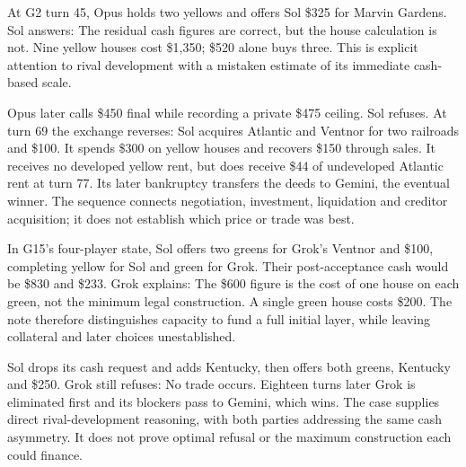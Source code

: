 
At G2 turn 45, Opus holds two yellows and offers Sol \$325 for Marvin Gardens. Sol answers:
The residual cash figures are correct, but the house calculation is not. Nine yellow houses cost \$1,350; \$520 alone buys three. This is explicit attention to rival development with a mistaken estimate of its immediate cash-based scale.

Opus later calls \$450 final while recording a private \$475 ceiling. Sol refuses. At turn 69 the exchange reverses: Sol acquires Atlantic and Ventnor for two railroads and \$100. It spends \$300 on yellow houses and recovers \$150 through sales. It receives no developed yellow rent, but does receive \$44 of undeveloped Atlantic rent at turn 77. Its later bankruptcy transfers the deeds to Gemini, the eventual winner. The sequence connects negotiation, investment, liquidation and creditor acquisition; it does not establish which price or trade was best.


In G15's four-player state, Sol offers two greens for Grok's Ventnor and \$100, completing yellow for Sol and green for Grok. Their post-acceptance cash would be \$830 and \$233. Grok explains:
The \$600 figure is the cost of one house on each green, not the minimum legal construction. A single green house costs \$200. The note therefore distinguishes capacity to fund a full initial layer, while leaving collateral and later choices unestablished.

Sol drops its cash request and adds Kentucky, then offers both greens, Kentucky and \$250. Grok still refuses:
No trade occurs. Eighteen turns later Grok is eliminated first and its blockers pass to Gemini, which wins. The case supplies direct rival-development reasoning, with both parties addressing the same cash asymmetry. It does not prove optimal refusal or the maximum construction each could finance.

